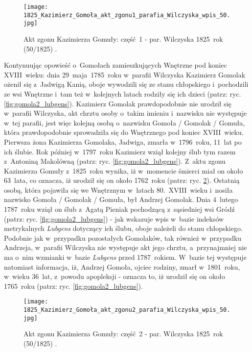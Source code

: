 \begin{figure}[!ht]
    \vspace*{0.5cm}
    \centering \texttt{[image: 
        1825\_Kazimierz\_Gomoła\_akt\_zgonu1\_parafia\_Wilczyska\_wpis\_50.jpg]}
    \captionsetup{format=hang}
    \caption{Akt zgonu Kazimierza Gomuły: część~1 - par. Wilczyska 1825~rok 
    (50/1825) \cite{par_wilczyska1}.}
    \label{fig:kgomola1}
\end{figure}

Kontynuując opowieść o~Gomołach zamieszkujących Wnętrzne pod koniec 
XVIII~wieku: dnia 29~maja~1785~roku w~parafii Wilczyska Kazimierz Gomolak 
ożenił się z~Jadwigą Kanią, oboje wywodzili się ze stanu chłopskiego 
i~pochodzili ze wsi Wnętrzne i~tam też w~kolejnych latach rodziły się ich 
dzieci (patrz: ryc. \ref{fig:gomola2_lubgens}). Kazimierz Gomolak 
prawdopodobnie nie urodził się w~parafii Wilczyska, akt chrztu osoby o~takim 
imieniu i~nazwisku nie występuje w~tej parafii, jest więc kolejną osobą 
o~nazwisku Gomoła / Gomolak / Gomuła, która prawdopodobnie sprowadziła się do 
Wnętrznego pod koniec XVIII~wieku. Pierwsza żona Kazimierza Gomolaka, 
Jadwiga, zmarła w~1796~roku, 11~lat po ich ślubie. Rok później w~1797~roku 
Kazimierz wziął kolejny ślub tym razem z~Antoniną Makolówną (patrz: ryc. 
\ref{fig:gomola2_lubgens}). Z~aktu zgonu Kazimierza Gomuły z~1825~roku 
wynika, iż w~momencie śmierci miał on około 63~lata, co oznacza, iż urodził 
się on około 1762~roku (patrz: ryc. \ref{fig:kgomola2}). Ostatnią osobą, 
która pojawiła się we Wnętrznym w~latach 80.~XVIII~wieku i~nosiła nazwisko 
Gomoła / Gomolak / Gomuła, był Andrzej Gomolak. Dnia 4~lutego 1787~roku wziął 
on ślub z~Agatą Pieniak pochodzącą z~sąsiedniej wsi Gródź (patrz: ryc. 
\ref{fig:gomola2_lubgens}) - jak wskazuje wpis w~bazie indeksów metrykalnych 
\emph{Lubgens} dotyczący ich ślubu, oboje należeli do stanu chłopskiego. 
Podobnie jak w~przypadku pozostałych Gomolaków, tak również w~przypadku 
Andrzeja, w~parafii Wilczyska nie występuje akt jego chrztu, a~przynajmniej 
nie ma o~nim wzmianki w~bazie \emph{Lubgens} przed 1787~rokiem. W~bazie tej 
występuje natomiast informacja, iż, Andrzej Gomoła, ojciec rodziny, zmarł 
w~1801~roku, w~wieku 36~lat, z~powodu apopleksji - oznacza to, iż urodził się 
on około 1765~roku (patrz: ryc. \ref{fig:gomola2_lubgens}).

\begin{figure}[!ht]
    \vspace*{0.5cm}
    \centering \texttt{[image: 
        1825\_Kazimierz\_Gomoła\_akt\_zgonu2\_parafia\_Wilczyska\_wpis\_50.jpg]}
    \captionsetup{format=hang}
    \caption{Akt zgonu Kazimierza Gomuły: część~2 - par. Wilczyska 1825~rok 
    (50/1825) \cite{par_wilczyska1}.}
    \label{fig:kgomola2}
\end{figure}

